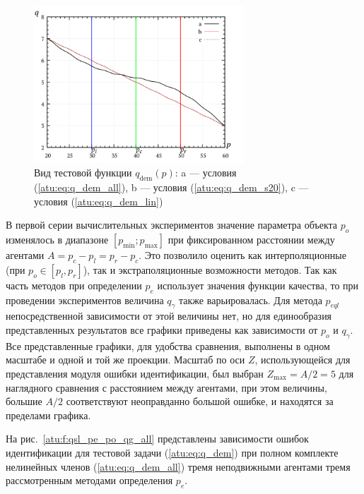 \begin{figure}[htb!]
  \centerline{\includegraphics[width=0.7\textwidth]{p/q_p_dem.png} }
  \caption{Вид тестовой функции $q_\mathrm{dem}(p)$:
     a --- условия (\ref{atu:eq:q_dem_all}),
     b --- условия (\ref{atu:eq:q_dem_s20}),
     c --- условия (\ref{atu:eq:q_dem_lin})
  }
  \label{atu:f:q_dem}
\end{figure}

В первой серии вычислительных экспериментов
значение параметра объекта $p_o$
изменялось в диапазоне  $[ p_{\min}; p_{\max}]$
при фиксированном расстоянии между агентами $A = p_c - p_l = p_r - p_c$.
Это позволило оценить как интерполяционные (при $p_o \in [p_l,p_r] $),
так и экстраполяционные возможности методов. Так как
часть методов при определении $p_e$ использует значения
функции качества, то при проведении экспериментов
величина $q_\gamma$ также варьировалась.
Для метода $p_{eql}$ непосредственной зависимости от этой величины нет,
но для единообразия представленных результатов
все графики приведены как зависимости от $p_o$ и $q_\gamma$.
Все представленные графики, для удобства сравнения,
выполнены в одном масштабе и одной и той же проекции.
Масштаб по оси $Z$, использующейся для представления
модуля ошибки идентификации, был выбран $Z_{\max} = A/2 = 5$
для наглядного сравнения с расстоянием между агентами,
при этом величины, большие $A/2$ соответствуют
неоправданно большой ошибке, и находятся за пределами графика.

На рис.~\ref{atu:f:qsl_pe_po_qg_all} представлены зависимости ошибок идентификации
для тестовой задачи (\ref{atu:eq:q_dem})
при полном комплекте нелинейных членов (\ref{atu:eq:q_dem_all})
тремя неподвижными агентами тремя рассмотренным методами определения $p_e$.

